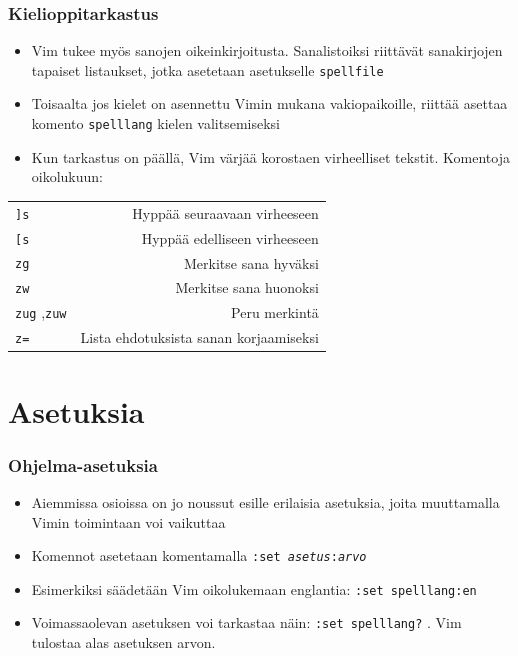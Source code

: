 \documentclass[]{beamer}
\newcommand{\Tohj}[1]{\texttt{#1}}
\newcommand{\com}[1]{{\color{blue!50!black}\Tohj{#1}} \!\!}
\newcommand{\set}[1]{\texttt{#1}}
\begin{document}
\begin{frame}
    \frametitle{Kielioppitarkastus}
    \begin{itemize}
        \item Vim tukee myös sanojen oikeinkirjoitusta. Sanalistoiksi riittävät sanakirjojen tapaiset listaukset, jotka asetetaan asetukselle \set{spellfile}
        \item Toisaalta jos kielet on asennettu Vimin mukana vakiopaikoille, riittää asettaa komento \set{spelllang} kielen valitsemiseksi
        \pause
        \item Kun tarkastus on päällä, Vim värjää korostaen virheelliset tekstit. Komentoja oikolukuun:
    \end{itemize}
    \begin{tabular}{lr}
    \com{]s} & Hyppää seuraavaan virheeseen \\
    \com{[s} & Hyppää edelliseen virheeseen \\
    \com{zg} & Merkitse sana hyväksi \\
    \com{zw} & Merkitse sana huonoksi \\
    \com{zug},\com{zuw} & Peru merkintä \\
    \com{z=} & Lista ehdotuksista sanan korjaamiseksi \\
    \end{tabular}
\end{frame}


\section {Asetuksia}

\begin{frame}
    \frametitle{Ohjelma-asetuksia}
    \begin{itemize}
        \item Aiemmissa osioissa on jo noussut esille erilaisia asetuksia, joita muuttamalla Vimin toimintaan voi vaikuttaa
        \item Komennot asetetaan komentamalla \com{:set \emph{asetus}:\emph{arvo}} 
        \item Esimerkiksi säädetään Vim oikolukemaan englantia: \com{:set spelllang:en}
        \pause
        \item Voimassaolevan asetuksen voi tarkastaa näin: \com{:set spelllang?}. Vim tulostaa alas asetuksen arvon.
    \end{itemize}
\end{frame}
\end{document}
